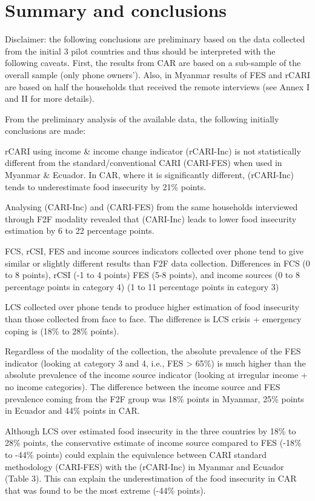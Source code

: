\documentclass[11pt,harvard]{article}
\begin{document}
\pagebreak

\section{Summary and conclusions}

Disclaimer: the following conclusions are preliminary based on the data collected from the initial 3 pilot countries and thus should be interpreted with the following caveats. First, the results from CAR are based on a sub-sample of the overall sample (only phone owners’). Also, in Myanmar results of FES and rCARI are based on half the households that received the remote interviews (see Annex I and II for more details). 

From the preliminary analysis of the available data, the following initially conclusions are made:     

rCARI using income \& income change indicator (rCARI-Inc) is not statistically different from the standard/conventional CARI (CARI-FES) when used in Myanmar \& Ecuador. In CAR, where it is significantly different, (rCARI-Inc) tends to underestimate food insecurity by 21\% points. 

Analysing (CARI-Inc) and (CARI-FES) from the same households interviewed through F2F modality revealed that (CARI-Inc) leads to lower food insecurity estimation by 6 to 22 percentage points. 

FCS, rCSI, FES and income sources indicators collected over phone tend to give similar or slightly different results than F2F data collection. Differences in FCS (0 to 8 points), rCSI (-1 to 4 points) FES (5-8 points), and income sources (0 to 8 percentage points in category 4) (1 to 11 percentage points in category 3)

LCS collected over phone tends to produce higher estimation of food insecurity than those collected from face to face. The difference is LCS crisis + emergency coping is (18\% to 28\% points).
 
Regardless of the modality of the collection, the absolute prevalence of the FES indicator (looking at category 3 and 4, i.e., FES > 65\%) is much higher than the absolute prevalence of the income source indicator (looking at irregular income + no income categories). The difference between the income source and FES prevalence coming from the F2F group was 18\% points in Myanmar, 25\% points in Ecuador and 44\% points in CAR. 
 
Although LCS over estimated food insecurity in the three countries by 18\% to 28\% points, the conservative estimate of income source compared to FES (-18\% to -44\% points) could explain the equivalence between CARI standard methodology (CARI-FES) with the (rCARI-Inc) in Myanmar and Ecuador (Table 3). This can explain the underestimation of the food insecurity in CAR that was found to be the most extreme (-44\% points). 
\end{document}
